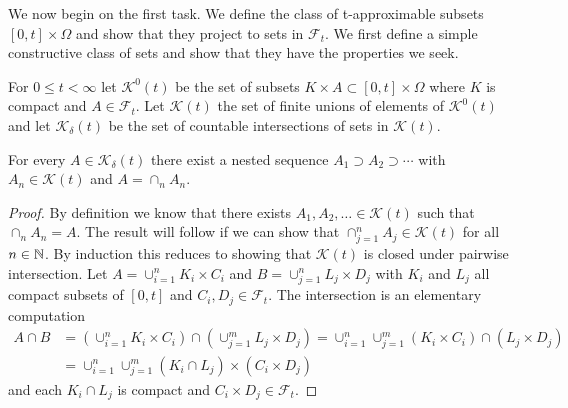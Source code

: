 We now begin on the first task.  We define the class of t-approximable subsets $[0,t] \times \Omega$ and show that they project to sets in $\mathcal{F}_t$.  We first define a simple constructive class of sets and show that they have the properties we seek.
\begin{defn}For $0 \leq t < \infty$ let $\mathcal{K}^0(t)$ be the set of subsets $K \times A \subset [0,t] \times \Omega$ where $K$ is compact and $A \in \mathcal{F}_t$.  Let $\mathcal{K}(t)$ the set of finite unions of elements of $\mathcal{K}^0(t)$ and let $\mathcal{K}_\delta(t)$ be the set of countable intersections of sets in $\mathcal{K}(t)$.  \end{defn}
\begin{lem}\label{KDeltaAsNestedIntersection}For every $A \in \mathcal{K}_\delta(t)$ there exist a nested sequence $A_1 \supset A_2 \supset \dotsb$ with $A_n \in \mathcal{K}(t)$ and $A = \cap_n A_n$.  
\end{lem}
\begin{proof}
By definition we know that there exists $A_1, A_2, \dotsc \in \mathcal{K}(t)$ such that $\cap_n A_n = A$.  The result will follow if we can show that $\cap_{j=1}^n A_j \in \mathcal{K}(t)$ for all $n \in \mathbb{N}$.  By induction this reduces to showing that $\mathcal{K}(t)$ is closed under pairwise intersection.  Let $A = \cup_{i=1}^n K_i \times C_i$ and 
$B = \cup_{j=1}^n L_j \times D_j$ with $K_i$ and $L_j$ all compact subsets of $[0,t]$ and $C_i, D_j \in \mathcal{F}_t$.  The intersection is an elementary computation
\begin{align*}
A \cap B &= (\cup_{i=1}^n K_i \times C_i) \cap (\cup_{j=1}^m L_j \times D_j) = \cup_{i=1}^n\cup_{j=1}^m (K_i \times C_i) \cap (L_j \times D_j) \\
&= \cup_{i=1}^n\cup_{j=1}^m (K_i \cap L_j) \times (C_i \times D_j)
\end{align*}
and each $K_i \cap L_j$ is compact and $C_i \times D_j \in \mathcal{F}_t$.
\end{proof}

